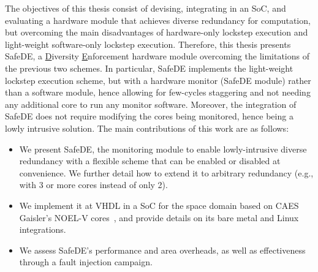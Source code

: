 The objectives of this thesis consist of devising, integrating in an SoC, and evaluating a hardware module that achieves diverse redundancy for computation, but overcoming the main disadvantages of hardware-only lockstep execution and light-weight software-only lockstep execution. 
Therefore, this thesis presents SafeDE, a \underline{D}iversity \underline{E}nforcement hardware module overcoming the limitations of the previous two schemes. In particular, SafeDE implements the light-weight lockstep execution scheme, but with a hardware monitor (SafeDE module) rather than a software module, hence allowing for few-cycles staggering and not needing any additional core to run any monitor software. Moreover, the integration of SafeDE does not require modifying the cores being monitored, hence being a lowly intrusive solution.
The main contributions of this work are as follows:
\begin{itemize}
\item We present SafeDE, the monitoring module to enable lowly-intrusive diverse redundancy with a flexible scheme that can be enabled or disabled at convenience. We further detail how to extend it to arbitrary redundancy (e.g., with 3 or more cores instead of only 2).
\item We implement it at VHDL in a SoC for the space domain based on CAES Gaisler's NOEL-V cores~\cite{SELENEgit}, and provide details on its bare metal and Linux integrations.
\item We assess SafeDE's performance and area overheads, as well as effectiveness through a fault injection campaign.
\end{itemize}



